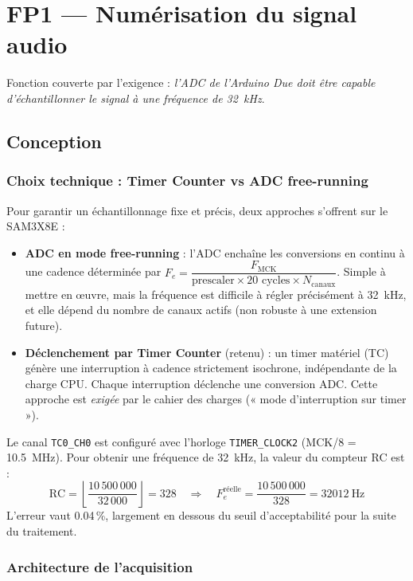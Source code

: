 \section{FP1 --- Numérisation du signal audio}
\label{sec:fp1}

Fonction couverte par l'exigence  : \emph{l'ADC de l'Arduino Due doit être capable d'échantillonner le signal à une fréquence de \SI{32}{\kilo\hertz}}.

\subsection{Conception}

\subsubsection{Choix technique : Timer Counter vs ADC free-running}

Pour garantir un échantillonnage fixe et précis, deux approches s'offrent sur le SAM3X8E :

\begin{itemize}
    \item \textbf{ADC en mode free-running} : l'ADC enchaîne les conversions en continu à une cadence déterminée par $F_e = \dfrac{F_{\text{MCK}}}{\text{prescaler} \times 20 \text{ cycles} \times N_{\text{canaux}}}$. Simple à mettre en œuvre, mais la fréquence est difficile à régler précisément à \SI{32}{\kilo\hertz}, et elle dépend du nombre de canaux actifs (non robuste à une extension future).
    \item \textbf{Déclenchement par Timer Counter} (retenu) : un timer matériel (TC) génère une interruption à cadence strictement isochrone, indépendante de la charge CPU. Chaque interruption déclenche une conversion ADC. Cette approche est \emph{exigée} par le cahier des charges (« mode d'interruption sur timer »).
\end{itemize}

Le canal \texttt{TC0\_CH0} est configuré avec l'horloge \texttt{TIMER\_CLOCK2} (MCK/8 = \SI{10.5}{\mega\hertz}). Pour obtenir une fréquence de \SI{32}{\kilo\hertz}, la valeur du compteur RC est :
\[
\text{RC} = \left\lfloor \frac{10\,500\,000}{32\,000} \right\rfloor = 328 \quad \Rightarrow \quad F_e^{\text{réelle}} = \frac{10\,500\,000}{328} = \SI{32012}{\hertz}
\]
L'erreur vaut \num{0.04}\,\%, largement en dessous du seuil d'acceptabilité pour la suite du traitement.

\subsubsection{Architecture de l'acquisition}

